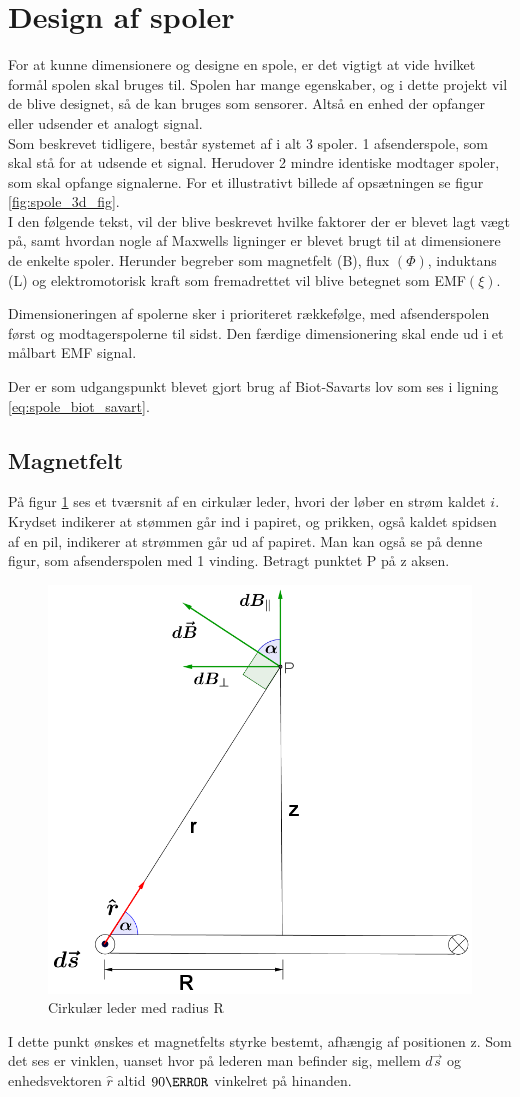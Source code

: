 \section{Design af spoler}\label{sec:sec_spole_design}
For at kunne dimensionere og designe en spole, er det vigtigt at vide hvilket formål spolen skal bruges til. Spolen har mange egenskaber, og i dette projekt vil de blive designet, så de kan bruges som sensorer. Altså en enhed der opfanger eller udsender et analogt signal. \\
Som beskrevet tidligere, består systemet af i alt 3 spoler. 1 afsenderspole, som skal stå for at udsende et signal. Herudover 2 mindre identiske modtager spoler, som skal opfange signalerne. For et illustrativt billede af opsætningen se figur \ref{fig:spole_3d_fig}.\\
I den følgende tekst, vil der blive beskrevet hvilke faktorer der er blevet lagt vægt på, samt hvordan nogle af Maxwells ligninger er blevet brugt til at dimensionere de enkelte spoler. Herunder begreber som magnetfelt (B), flux $(\Phi)$, induktans (L) og elektromotorisk kraft som fremadrettet vil blive betegnet som EMF$(\xi)$. 

Dimensioneringen af spolerne sker i prioriteret rækkefølge, med afsenderspolen først og modtagerspolerne til sidst.
Den færdige dimensionering skal ende ud i et målbart EMF signal.

Der er som udgangspunkt blevet gjort brug af Biot-Savarts lov som ses i ligning \ref{eq:spole_biot_savart}.
\subsection{Magnetfelt}

På figur \ref{fig:spole_fig1} ses et tværsnit af en cirkulær leder, hvori der løber en strøm kaldet $i$. 
Krydset indikerer at stømmen går ind i papiret, og prikken, også kaldet spidsen af en pil, indikerer at strømmen går ud af papiret. 
Man kan også se på denne figur, som afsenderspolen med 1 vinding. 
Betragt punktet P på z aksen.
\begin{figure}
	\centering
	\includegraphics[width=.5\textwidth]{billeder/B_felt.png}
	\caption{Cirkulær leder med radius R}
	\label{fig:spole_fig1}
\end{figure} 
I dette punkt ønskes et magnetfelts styrke bestemt, afhængig af positionen z. 
Som det ses er vinklen, uanset hvor på lederen man befinder sig, mellem $d\vec{s}$ og enhedsvektoren $\hat{r}$ altid $90\degree$ vinkelret på hinanden.

